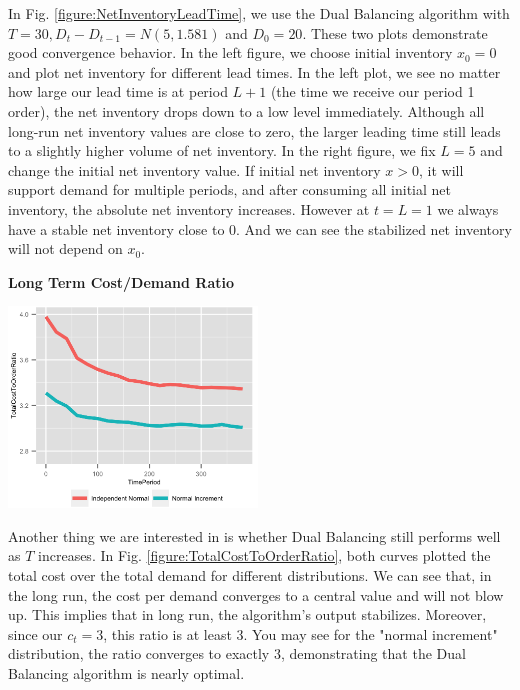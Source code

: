 \documentclass[twoside]{article}
\begin{document}
\begin{multicols}{2}
In Fig. \ref{figure:NetInventoryLeadTime}, we use the Dual Balancing algorithm with $T=30,D_t-D_{t-1} = N(5,1.581)$ and $D_0=20$. These two plots demonstrate good convergence behavior. In the left figure, we choose initial inventory $x_0 = 0$ and plot net inventory for different lead times. In the left plot, we see no matter how large our lead time is at period $L+1$ (the time we receive our period 1 order), the net inventory drops down to a low level immediately. Although all long-run net inventory values are close to zero, the larger leading time still leads to a slightly higher volume of net inventory. In the right figure, we fix $L = 5$ and change the initial net inventory value. If initial net inventory $x > 0$, it will support demand for multiple periods, and after consuming all initial net inventory, the absolute net inventory increases. However at $t=L=1$ we always have a stable net inventory close to 0. And we can see the stabilized net inventory will not depend on $x_0$.\\
\newpage
\begin{center}
  \textbf{Long Term Cost/Demand Ratio}
\end{center}
\begin{center}
  \label{figure:TotalCostToOrderRatio}
  \includegraphics[width=2.6in]{figures/TotalCostToOrderRatio.png}
\end{center}
Another thing we are interested in is whether Dual Balancing still performs well as $T$ increases. In Fig. \ref{figure:TotalCostToOrderRatio}, both curves plotted the total cost over the total demand for different distributions. We can see that, in the long run, the cost per demand converges to a central value and will not blow up. This implies that in long run, the algorithm's output stabilizes. Moreover, since our $c_t=3$, this ratio is at least $3$. You may see for the "normal increment" distribution, the ratio converges to exactly $3$, demonstrating that the Dual Balancing algorithm is nearly optimal.

\end{multicols}
\end{document}
